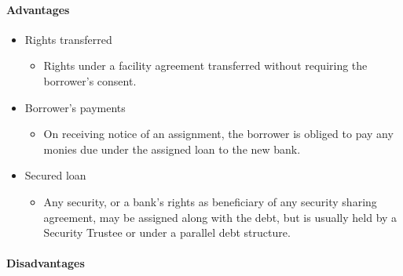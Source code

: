 \documentclass[
]{article}
\providecommand{\tightlist}{%
  \setlength{\itemsep}{0pt}\setlength{\parskip}{0pt}}
\begin{document}
\hypertarget{advantages-1}{%
\paragraph{Advantages}\label{advantages-1}}

\begin{itemize}
\tightlist
\item
  Rights transferred

  \begin{itemize}
  \tightlist
  \item
    Rights under a facility agreement transferred without requiring the
    borrower's consent.
  \end{itemize}
\item
  Borrower's payments

  \begin{itemize}
  \tightlist
  \item
    On receiving notice of an assignment, the borrower is obliged to pay
    any monies due under the assigned loan to the new bank.
  \end{itemize}
\item
  Secured loan

  \begin{itemize}
  \tightlist
  \item
    Any security, or a bank's rights as beneficiary of any security
    sharing agreement, may be assigned along with the debt, but is
    usually held by a Security Trustee or under a parallel debt
    structure.
  \end{itemize}
\end{itemize}

\hypertarget{disadvantages-1}{%
\paragraph{Disadvantages}\label{disadvantages-1}}
\end{document}
